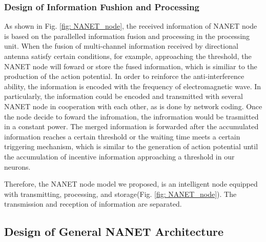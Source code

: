\documentclass[journal,comsoc]{IEEEtran}
\begin{document}
			\subsubsection{Design of Information Fushion and Processing}
				As shown in Fig. \ref{fig: NANET_node}, the received information of NANET node is based on the parallelled information fusion and processing in the processing unit.
				When the fusion of multi-channel information received by directional antenna satisfy certain conditions, for example, approaching the threshold, 
				the NANET node will foward or store the fused information, which is similiar to the production of the action potential.
				In order to reinforce the anti-interference ability, the information is encoded with the frequency of electromagnetic wave.
				In particularly, the information could be encoded and transmitted with several NANET node in cooperation with each other, as is done by network coding.
				Once the node decide to foward the infromation, the infrormation would be trasmitted in a constant power.
				The merged information is forwarded after the accumulated information reaches a certain threshold or the waiting time meets a certain triggering mechanism, 
				which is similar to the generation of action potential until the accumulation of incentive information approaching a threshold in our neurons.
				
				Therefore, the NANET node model we proposed, is an intelligent node equipped with transmitting, processing, and storage(Fig. \ref{fig: NANET_node}).
				The transmission and reception of information are separated.
	
		\subsection{Design of General NANET Architecture}
			
\end{document}
